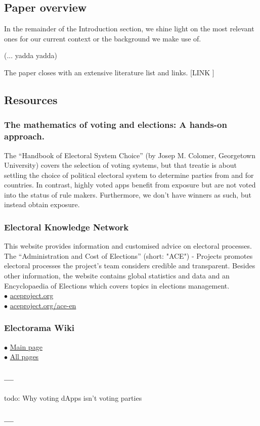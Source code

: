 
\subsection{Paper overview}

In the remainder of the Introduction section, we shine light on the most relevant ones for our current context or the background we make use of.

(... yadda yadda)

The paper closes with an extensive literature list and links. [LINK ]

\subsection{Resources} 

\subsubsection{The mathematics of voting and elections: A hands-on approach.}
The ``Handbook of Electoral System Choice'' (by Josep M. Colomer, Georgetown University) covers the selection of voting systems, but that treatie is about settling the choice of political electoral system to determine parties from and for countries. In contrast, highly voted apps benefit from exposure but are not voted into the status of rule makers.
Furthermore, we don't have winners as such, but instead obtain exposure.

\subsubsection{Electoral Knowledge Network} 
This website provides information and customised advice on electoral processes. 
The ``Administration and Cost of Elections'' (short: "ACE") - Projects promotes electoral processes the project's team considers credible and transparent. 
Besides other information, the website contains global statistics and data and an Encyclopaedia of Elections which covers topics in elections management. \\
$\bullet$ \href{http://www.aceproject.org/}{aceproject.org}\\
$\bullet$ \href{http://aceproject.org/ace-en}{aceproject.org/ace-en}

\subsubsection{Electorama Wiki} 
$\bullet$ \href{https://wiki.electorama.com}{Main page}\\
$\bullet$ \href{hhttps://wiki.electorama.com/wiki/Special:AllPages}{All pages}

\subsubsection{---} 
{todo: Why voting dApps isn't voting parties}

\subsubsection{---} 